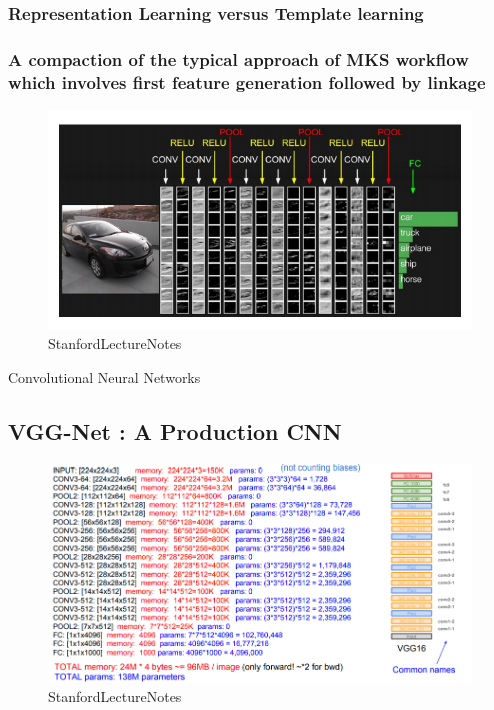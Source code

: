 \documentclass[11pt]{article}
\makeatletter
\def\maxwidth{\ifdim\Gin@nat@width>\linewidth\linewidth
    \else\Gin@nat@width\fi}
\let\Oldincludegraphics\includegraphics
\renewcommand{\includegraphics}[1]{\Oldincludegraphics[width=.8\maxwidth]{#1}}
\makeatother
\begin{document}
\hypertarget{representation-learning-versus-template-learning}{%
\subsubsection{Representation Learning versus Template
learning}\label{representation-learning-versus-template-learning}}

\hypertarget{a-compaction-of-the-typical-approach-of-mks-workflow-which-involves-first-feature-generation-followed-by-linkage}{%
\subsubsection{A compaction of the typical approach of MKS workflow
which involves first feature generation followed by
linkage}\label{a-compaction-of-the-typical-approach-of-mks-workflow-which-involves-first-feature-generation-followed-by-linkage}}

\begin{figure}
\centering
\includegraphics{pres_imgs/typical_cnn.png}
\caption{StanfordLectureNotes}
\end{figure}

    Convolutional Neural Networks

\hypertarget{vgg-net-a-production-cnn}{%
\subsection{VGG-Net : A Production CNN}\label{vgg-net-a-production-cnn}}

\begin{figure}
\centering
\includegraphics{pres_imgs/vgg_net.png}
\caption{StanfordLectureNotes}
\end{figure}
\end{document}
